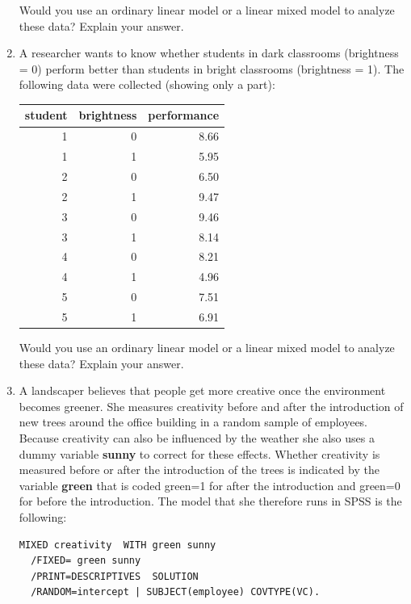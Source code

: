\documentclass[]{book}\usepackage[]{graphicx}\usepackage[]{color}
\newenvironment{knitrout}{}{} %
\begin{document}
\begin{enumerate}
\begin{knitrout}
\end{knitrout}

Would you use an ordinary linear model or a linear mixed model to analyze these data? Explain your answer.

\item  A researcher wants to know whether students in dark classrooms (brightness = 0) perform better than students in bright classrooms (brightness = 1). The following data were collected (showing only a part):


\begin{knitrout}
\color{fgcolor}
\begin{tabular}{r|r|r}
\hline
student & brightness & performance\\
\hline
1 & 0 & 8.66\\
\hline
1 & 1 & 5.95\\
\hline
2 & 0 & 6.50\\
\hline
2 & 1 & 9.47\\
\hline
3 & 0 & 9.46\\
\hline
3 & 1 & 8.14\\
\hline
4 & 0 & 8.21\\
\hline
4 & 1 & 4.96\\
\hline
5 & 0 & 7.51\\
\hline
5 & 1 & 6.91\\
\hline
\end{tabular}


\end{knitrout}

Would you use an ordinary linear model or a linear mixed model to analyze these data? Explain your answer.



\item 
A landscaper believes that people get more creative once the environment becomes greener. She measures creativity before and after the introduction of new trees around the office building in a random sample of employees. Because creativity can also be influenced by the weather she also uses a dummy variable \textbf{sunny} to correct for these effects. Whether creativity is measured before or after the introduction of the trees is indicated by the variable \textbf{green} that is coded green=1 for after the introduction and green=0 for before the introduction. The model that she therefore runs in SPSS is the following:

\begin{verbatim}
MIXED creativity  WITH green sunny
  /FIXED= green sunny
  /PRINT=DESCRIPTIVES  SOLUTION
  /RANDOM=intercept | SUBJECT(employee) COVTYPE(VC).
\end{verbatim}


\end{enumerate}
\end{document}
